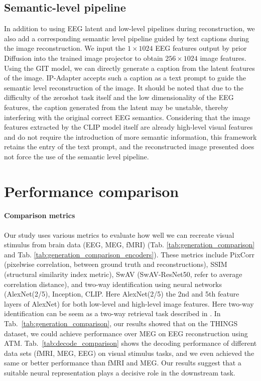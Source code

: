 \documentclass{article}
\begin{document}
\subsection{Semantic-level pipeline}
In addition to using EEG latent and low-level pipelines during reconstruction, we also add a corresponding semantic level pipeline guided by text captions during the image reconstruction. We input the \(1 \times 1024\) EEG features output by prior Diffusion into the trained image projector to obtain \(256 \times 1024\) image features. Using the GIT model\cite{wang2022git}, we can directly generate a caption from the latent features of the image. IP-Adapter accepts such a caption as a text prompt to guide the semantic level reconstruction of the image. It should be noted that due to the difficulty of the zeroshot task itself and the low dimensionality of the EEG features, the caption generated from the latent may be unstable, thereby interfering with the original correct EEG semantics. Considering that the image features extracted by the CLIP model itself are already high-level visual features and do not require the introduction of more semantic information, this framework retains the entry of the text prompt, and the reconstructed image presented does not force the use of the semantic level pipeline.




\section{Performance comparison}
\label{sec:comparation}

\paragraph{Comparison metrics} Our study uses various metrics to evaluate how well we can recreate visual stimulus from brain data (EEG, MEG, fMRI) (Tab. \ref{tab:generation_comparison} and Tab. \ref{tab:generation_comparison_encoders}). These metrics include PixCorr (pixelwise correlation, between ground truth and reconstructions), SSIM (structural similarity index metric)\cite{wang2004image}, SwAV (SwAV-ResNet50, refer to average correlation distance)\cite{caron2020unsupervised}, and two-way identification using neural networks (AlexNet(2/5), Inception, CLIP. Here AlexNet(2/5) the 2nd and 5th feature layers of AlexNet) for both low-level and high-level image features. Here two-way identification can be seem as a two-way retrieval task described in \cite{ozcelik2023natural}. In Tab.~\ref{tab:generation_comparison}, our results showed that on the THINGS dataset, we could achieve performance over MEG on EEG reconstruction using ATM. Tab.~\ref{tab:decode_comparison} shows the decoding performance of different data sets (fMRI, MEG, EEG) on visual stimulus tasks, and we even achieved the same or better performance than fMRI and MEG. Our results suggest that a suitable neural representation plays a decisive role in the downstream task.
\end{document}
